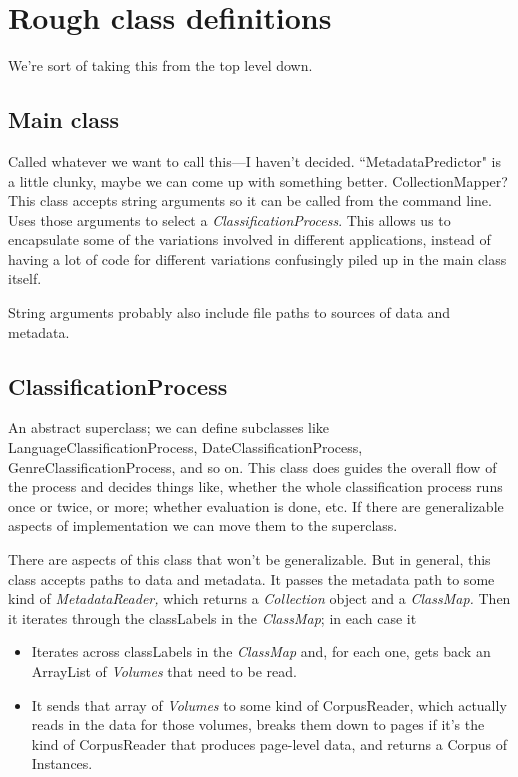 \documentclass[12pt]{article}
\begin{document}
\section{Rough class definitions}

We're sort of taking this from the top level down.

\subsection{Main class}

Called whatever we want to call this---I haven't decided. ``MetadataPredictor" is a little clunky, maybe we can come up with something better. CollectionMapper? This class accepts string arguments so it can be called from the command line. Uses those arguments to select a \emph{ClassificationProcess}. This allows us to encapsulate some of the variations involved in different applications, instead of having a lot of code for different variations confusingly piled up in the main class itself.

String arguments probably also include file paths to sources of data and metadata.

\subsection{ClassificationProcess}

An abstract superclass; we can define subclasses like LanguageClassificationProcess, DateClassificationProcess, GenreClassificationProcess, and so on. This class does guides the overall flow of the process and decides things like, whether the whole classification process runs once or twice, or more; whether evaluation is done, etc. If there are generalizable aspects of implementation we can move them to the superclass.

There are aspects of this class that won't be generalizable. But in general, this class accepts paths to data and metadata. It passes the metadata path to some kind of \emph{MetadataReader,} which returns a \emph{Collection} object and a \emph{ClassMap.} Then it iterates through the classLabels in the \emph{ClassMap}; in each case it 
\begin{itemize}
\item Iterates across classLabels in the \emph{ClassMap} and, for each one, gets back an ArrayList of \emph{Volumes} that need to be read.
\item It sends that array of \emph{Volumes} to some kind of {CorpusReader,} which actually reads in the data for those volumes, breaks them down to pages if it's the kind of {CorpusReader} that produces page-level data, and returns a {Corpus} of {Instances.}
\end{itemize}
\end{document}
